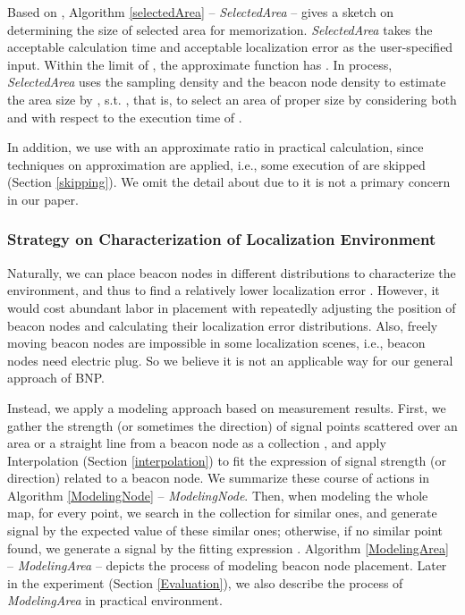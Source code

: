 \documentclass[10pt, conference, letterpaper]{IEEEtran}
\begin{document}
Based on , Algorithm \ref{selectedArea} -- \textit{SelectedArea} -- gives a sketch on determining the size of selected area for memorization. \textit{SelectedArea} takes the acceptable calculation time  and acceptable localization error  as the user-specified input. Within the limit of , the approximate function  has . In process, \textit{SelectedArea} uses the sampling density  and the beacon node density  to estimate the area size  by , s.t. , that is, to select an area of proper size by considering both  and  with respect to the execution time of .

In addition, we use  with an approximate ratio  in practical calculation, since techniques on approximation are applied, i.e., some execution of  are skipped (Section \ref{skipping}). We omit the detail about  due to it is not a primary concern in our paper.

\subsubsection{Strategy on Characterization of Localization Environment}
Naturally, we can place beacon nodes in different distributions to characterize the environment, and thus to find a relatively lower localization error . However, it would cost abundant labor in placement with repeatedly adjusting the position of beacon nodes and calculating their localization error distributions. Also, freely moving beacon nodes are impossible in some localization scenes, i.e., beacon nodes need electric plug. So we believe it is not an applicable way for our general approach of BNP.

Instead, we apply a modeling approach based on measurement results. First, we gather the strength (or sometimes the direction) of signal points scattered over an area or a straight line from a beacon node as a collection , and apply Interpolation (Section \ref{interpolation}) to fit the expression  of signal strength (or direction) related to a beacon node. We summarize these course of actions in Algorithm \ref{ModelingNode} -- \textit{ModelingNode}. Then, when modeling the whole map, for every point, we search in the collection  for similar ones, and generate signal by the expected value of these similar ones; otherwise, if no similar point found, we generate a signal by the fitting expression . Algorithm \ref{ModelingArea} -- \textit{ModelingArea} -- depicts the process of modeling beacon node placement. Later in the experiment (Section \ref{Evaluation}), we also describe the process of \textit{ModelingArea} in practical environment.
\end{document}
